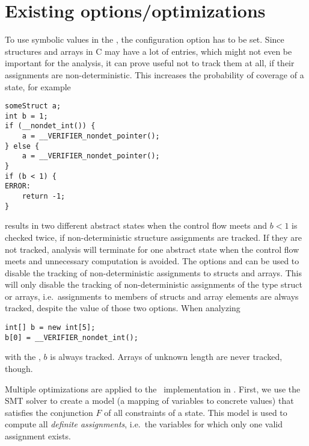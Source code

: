 \section{Existing options/optimizations}
To use symbolic values in the , the configuration option  has to be set.
Since structures and arrays in C may have a lot of entries, which might not even be important for the analysis,
it can prove useful not to track them at all, if their assignments are non-deterministic.
This increases the probability of coverage of a state, for example
\begin{lstlisting}
someStruct a;
int b = 1;
if (__nondet_int()) {
	a = __VERIFIER_nondet_pointer();
} else {
	a = __VERIFIER_nondet_pointer();
}
if (b < 1) {
ERROR:
	return -1;
}
\end{lstlisting}
results in two different abstract states when the control flow meets and $b < 1$ is checked twice, if non-deterministic structure assignments are tracked.
If they are not tracked, analysis will terminate for one abstract state when the control flow meets and unnecessary computation is avoided.
The options  and 
can be used to disable the tracking of non-deterministic assignments to structs and arrays.
This will only disable the tracking of non-deterministic assignments of the type struct or arrays, i.e.\ assignments to members of structs and array elements
are always tracked, despite the value of those two options.
When analyzing
\begin{lstlisting}
int[] b = new int[5];
b[0] = __VERIFIER_nondet_int();
\end{lstlisting}
with the \symbolicExecutionCPA, $b$ is always tracked.
Arrays of unknown length are never tracked, though.

Multiple optimizations are applied to the \constraintsCPA\ implementation in \cpaChecker.
First, we use the SMT solver to create a model (a mapping of variables to concrete values) that satisfies the conjunction $F$ of all constraints of a state.
This model is used to compute all \emph{definite assignments}, i.e.\ the variables for which only one valid assignment exists.

